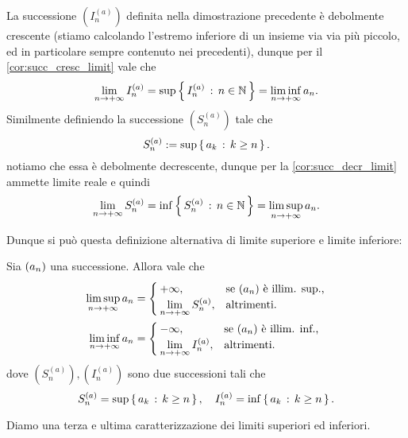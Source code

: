 \begin{remark}
    La successione $\left( I^{(a)}_n \right)$ definita nella dimostrazione precedente è debolmente crescente (stiamo calcolando l'estremo inferiore di un insieme via via più piccolo, ed in particolare sempre contenuto nei precedenti), dunque per il \autoref{cor:succ_cresc_limit} vale che \[
        \lim_{n \to +\infty} I^{(a)}_n = \sup \left\{\,I^{(a)}_n \,:\, n \in \mathbb{N}\,\right\} = \liminf_{n \to +\infty} a_n.    
    \] 
    Similmente definiendo la successione $\left( S^{(a)}_n \right)$ tale che \[
        S^{(a)}_n := \sup \left\{\,a_k \,:\, k \geq n\,\right\}.
    \] notiamo che essa è debolmente decrescente, dunque per la \autoref{cor:succ_decr_limit} ammette limite reale e quindi \[
        \lim_{n \to +\infty} S^{(a)}_n = \inf \left\{\,S^{(a)}_n \,:\, n \in \mathbb{N}\,\right\} = \limsup_{n \to +\infty} a_n.    
    \] 
\end{remark}
Dunque si può questa definizione alternativa di limite superiore e limite inferiore:
\begin{corollary}
     \label{cor:caratt_2_limsupinf}
    Sia $\seqn*{a}$ una successione. Allora vale che 
    \begin{align}
        \limsup_{n \to +\infty} a_n &= \begin{cases}
            +\infty, &\text{se $\seqn*{a}$ è illim. sup.,}\\
            \displaystyle \lim_{n \to +\infty} S^{(a)}_n , &\text{altrimenti.}
        \end{cases} \label{def:limsup_II}\\
        \liminf_{n \to +\infty} a_n &= \begin{cases}
            -\infty, &\text{se $\seqn*{a}$ è illim. inf.,}\\
            \displaystyle \lim_{n \to +\infty} I^{(a)}_n , &\text{altrimenti.} \label{def:liminf_II}
        \end{cases}
    \end{align}
    dove $\left(S^{(a)}_n\right), \left(I^{(a)}_n\right)$ sono due successioni tali che \[
        S^{(a)}_n = \sup \left\{\,a_k \,:\, k \geq n\,\right\}, \quad I^{(a)}_n = \inf \left\{\,a_k \,:\, k \geq n\,\right\}.   
    \]
\end{corollary}
    
Diamo una terza e ultima caratterizzazione dei limiti superiori ed inferiori.

